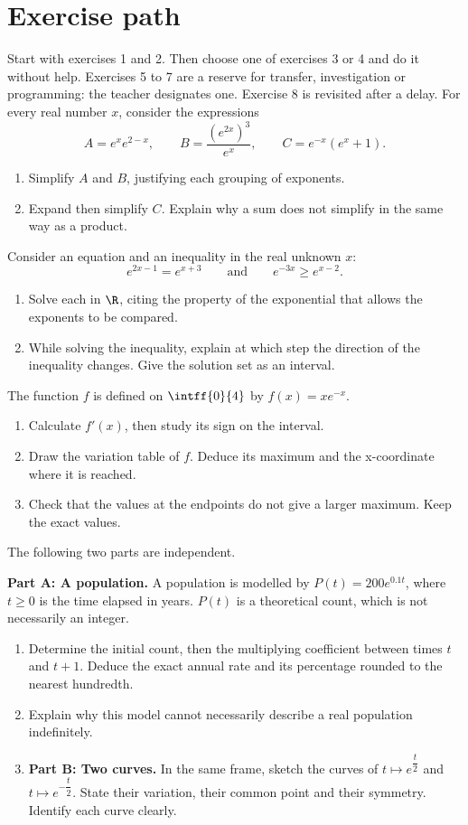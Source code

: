 \section*{Exercise path}\label{C09-PARC}
Start with exercises 1 and 2. Then choose one of exercises 3 or 4 and do it without help. Exercises 5 to 7 are a reserve for transfer, investigation or programming: the teacher designates one. Exercise 8 is revisited after a delay.
\begingroup
{}
For every real number $x$, consider the expressions\[A=e^xe^{2-x},\qquad B=\dfrac{(e^{2x})^3}{e^x},\qquad C=e^{-x}(e^x+1).\]
\begin{enumerate}[label=\arabic*.]
\item Simplify $A$ and $B$, justifying each grouping of exponents.
\item Expand then simplify $C$. Explain why a sum does not simplify in the same way as a product.
\end{enumerate}
Consider an equation and an inequality in the real unknown $x$:\[e^{2x-1}=e^{x+3}\qquad\text{and}\qquad e^{-3x}\geq e^{x-2}.\]
\begin{enumerate}[label=\arabic*.]
\item Solve each in $\R$, citing the property of the exponential that allows the exponents to be compared.
\item While solving the inequality, explain at which step the direction of the inequality changes. Give the solution set as an interval.
\end{enumerate}
The function $f$ is defined on $\intff{0}{4}$ by $f(x)=xe^{-x}$.
\begin{enumerate}[label=\arabic*.]
\item Calculate $f\prime(x)$, then study its sign on the interval.
\item Draw the variation table of $f$. Deduce its maximum and the x-coordinate where it is reached.
\item Check that the values at the endpoints do not give a larger maximum. Keep the exact values.
\end{enumerate}
The following two parts are independent.\par\textbf{Part A: A population.} A population is modelled by $P(t)=200e^{\num{0,1}t}$, where $t\geq0$ is the time elapsed in years. $P(t)$ is a theoretical count, which is not necessarily an integer.
\begin{enumerate}[label=\arabic*.]
\item Determine the initial count, then the multiplying coefficient between times $t$ and $t+1$. Deduce the exact annual rate and its percentage rounded to the nearest hundredth.
\item Explain why this model cannot necessarily describe a real population indefinitely.
\item \textbf{Part B: Two curves.} In the same frame, sketch the curves of $t\mapsto e^{\dfrac{t}{2}}$ and $t\mapsto e^{-\dfrac{t}{2}}$. State their variation, their common point and their symmetry. Identify each curve clearly.
\end{enumerate}
